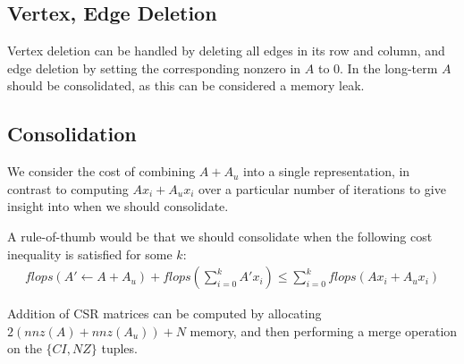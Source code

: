 \documentclass[11pt]{article}
\begin{document}
\subsection{Vertex, Edge Deletion}
Vertex deletion can be handled by deleting all edges in its row and column, and edge deletion by setting the corresponding nonzero in $A$ to 0. In the long-term $A$ should be consolidated, as this can be considered a memory leak. 

\subsection{Consolidation}
We consider the cost of combining $A+A_u$ into a single representation, in contrast to computing $Ax_i + A_ux_i$ over a particular number of iterations to give insight into when we should consolidate. 

A rule-of-thumb would be that we should consolidate when the following cost inequality is satisfied for some $k$: \begin{align} flops(A'\gets A + A_u) + flops(\sum_{i=0}^k A'x_i) \leq \sum_{i=0}^k flops(Ax_i + A_ux_i)\end{align}

Addition of CSR matrices can be computed by allocating $2(nnz(A)+nnz(A_u)) + N$ memory, and then performing a merge operation on the $\{CI,NZ\}$ tuples.  






\end{document}
